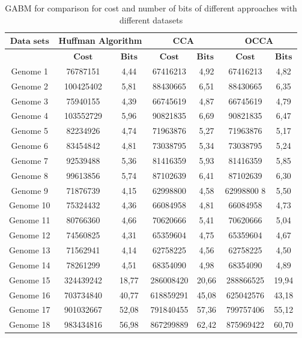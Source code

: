 \documentclass[preprint,12pt]{elsarticle}
\begin{document}
\begin{table}
\small
\label{datas}
\caption{GABM for comparison for cost and number of bits of different approaches with different datasets}
\begin{center}
\begin{tabular}{c | c c | c c | c c}
\toprule
$\textbf{Data sets}$ & \multicolumn{2}{c}{Huffman Algorithm} & \multicolumn{2}{c}{CCA }& \multicolumn{2}{c}{OCCA}\\\hline
 & $\textbf{Cost}$	& $\textbf{Bits}$ &	$\textbf{Cost}$&	$\textbf{Bits	}$&$\textbf{Cost}$&	$\textbf{Bits}$
\\\hline
Genome 1& 76787151  &	4,44	&67416213   & 4,92	& 67416213 & 4,82 \\\hline
Genome 2& 100425402 &  	5,81	& 88430665	& 6,51	& 88430665&  6,35 \\\hline
Genome 3& 75940155  &	4,39    &66745619	& 4,87&	66745619 & 4,79 \\\hline
Genome 4& 103552729 &	5,96    &90821835&	6,69 &	90821835  & 6,47\\\hline
Genome 5& 82234926  &	4,74	&71963876	& 5,27 &	71963876 &5,17 \\\hline
Genome 6& 83454842  &   4,81	&73038795	& 5,34	&73038795 & 5,24\\\hline
Genome 7& 92539488  &	5,36    &81416359   &5,93	&81416359 & 5,85\\\hline
Genome 8& 99613856  & 	5,74	&87102639   &6,41	&87102639&	6,30 \\\hline
Genome 9& 71876739  &	4,15    &62998800  &4,58 &	62998800 8&	5,50 \\\hline
Genome 10& 75324432 & 	4,36	&66084958  &4,81	&66084958&	4,73 \\\hline
Genome 11& 80766360 &	4,66    &70620666  &5,41&	70620666&	5,04 \\\hline
Genome 12& 74560825 &	4,31    &65359604  &4,75	&65359604&	4,67\\\hline
Genome 13& 71562941 & 	4,14	&62758225  &4,56	&	62758225 &	4,50\\\hline
Genome 14& 78261299 & 	4,51    &68354090  &4,98&	68354090& 4,89  \\\hline
Genome 15& 324439242& 	18,77    &286008420 & 20,66	 &	288866525 &	19,94 \\\hline
Genome 16& 703734840&  40,77    &618859291 & 45,08  &	625042576 &	43,18 \\\hline
Genome 17& 901032667&  52,08    &791840455 &	57,36 &	799757406 &	55,12 \\\hline
Genome 18& 983434816&  56,98    &867299889 &	62,42 &	875969422 & 60,70 \\\hline

\bottomrule
\end{tabular}
\end{center}
\end{table}
\end{document}

